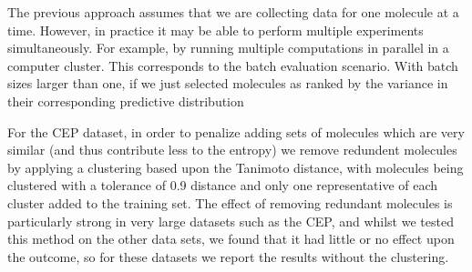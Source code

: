 The previous approach assumes that we are collecting data for one molecule at a time.  However, in practice it may be able to perform multiple experiments simultaneously. For example, by running multiple computations in parallel in a computer cluster. This corresponds to the batch evaluation scenario. With batch sizes larger than one, if we just selected molecules as ranked by the variance in their corresponding predictive distribution

For the CEP dataset, in order to penalize adding sets of molecules which are very similar (and thus contribute less to the entropy) we remove redundent molecules by applying a clustering based upon the Tanimoto distance, with molecules being clustered with a tolerance of 0.9 distance and only one representative of each cluster added to the training set.  The effect of removing redundant molecules is particularly strong in very large datasets such as the CEP, and whilst we tested this method on the other data sets, we found that it had little or no effect upon the outcome, so for these datasets we report the results without the clustering.